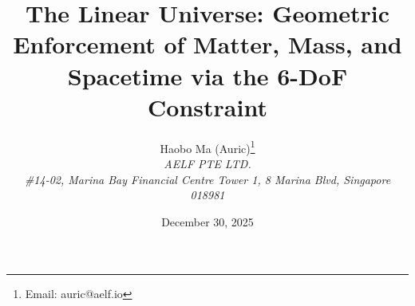 \documentclass[11pt,a4paper]{article}
\title{The Linear Universe: Geometric Enforcement of Matter, Mass, and Spacetime via the 6-DoF Constraint}
\author{Haobo Ma (Auric)\thanks{Email: auric@aelf.io} \\
\textit{AELF PTE LTD.} \\
\textit{\#14-02, Marina Bay Financial Centre Tower 1, 8 Marina Blvd, Singapore 018981}}
\date{December 30, 2025}
\begin{document}
\sloppy
\maketitle












\FloatBarrier
\appendix
\renewcommand{\thesection}{\AlphAlph{\value{section}}}


\FloatBarrier

\end{document}
